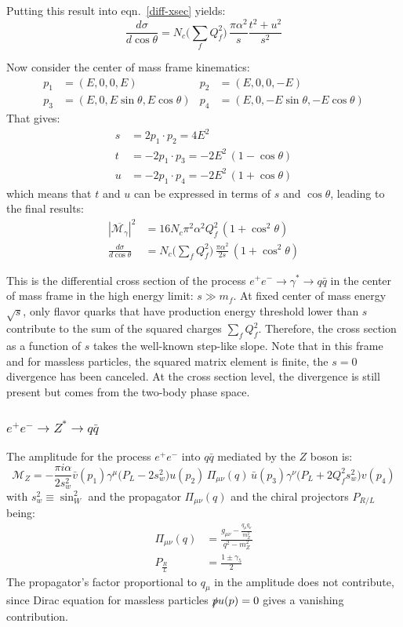 \documentclass[]{article}
\begin{document}
Putting this result into eqn.~\ref{diff-xsec} yields:
\begin{equation}
	\frac{d\sigma}{d\cos\theta} =
	N_c\big(\sum_fQ_f^2\big) \,\frac{\pi\alpha^2}{s} \frac{t^2+u^2}{s^2}
\end{equation}

Now consider the center of mass frame kinematics:
\begin{align*}
	p_1 &= (E,0,0,E) &	p_2 &= (E,0,0,-E)\\
	p_3 &= (E,0, E\sin\theta, E\cos\theta) & p_4 &= (E,0, -E\sin\theta, -E\cos\theta)
\end{align*}
That gives:
\begin{align*}
	s &= 2 p_1 \cdot p_2 = 4 E^2 \\
	t &= -2 p_1 \cdot p_3 = -2 E^2 \,(1-\cos\theta) \\
	u &= -2 p_1 \cdot p_4 = -2 E^2 \,(1+\cos\theta)
\end{align*}
which means that $t$ and $u$ can be expressed in terms of $s$ and $\cos\theta$,
leading to the final results:
\begin{align}
	\label{a2}
	|\overline{\mathcal{M}_\gamma}|^2 &= 16N_c \pi^2\alpha^2 Q_f^2\,(1+\cos^2\theta)\\
	\frac{d\sigma}{d\cos\theta} &= N_c\big(\sum_fQ_f^2\big) \,\frac{\pi\alpha^2}{2s}\, (1+\cos^2\theta)
\end{align}

This is the differential cross section of the process $e^+ e^- \rightarrow
\gamma^* \rightarrow q \bar{q}$ in the center of mass frame in the high energy
limit: $s \gg m_f$. At fixed center of mass energy $\sqrt{s}$, only flavor quarks
that have production energy threshold lower than $s$ contribute to the sum of
the squared charges $\sum_fQ^2_f$. Therefore, the cross section as a function of
$s$ takes the well-known step-like slope. Note that in this frame and for massless
particles, the squared matrix element is finite, the $s=0$ divergence has been
canceled. At the cross section level, the divergence is still present but
comes from the two-body phase space.

\subsubsection{$e^+ e^- \rightarrow Z^* \rightarrow q \bar{q}$}
The amplitude for the process $e^+ e^-$ into $q \bar{q}$ mediated by the $Z$ boson is:
\begin{equation}
\mathcal{M}_Z = -\frac{\pi i \alpha}{2 s^2_w} 
\bar{v}(p_1)\gamma^\mu\big(P_L-2s^2_w\big) u(p_2)\,\Pi_{\mu\nu}(q)\,
\bar{u}(p_3)\gamma^\nu \big(P_L+2Q_f^2 s^2_w\big) v(p_4)
\end{equation}
with $s^2_w \equiv \sin^2_W$ and the propagator $\Pi_{\mu\nu}(q)$ and the chiral
projectors $P_{R/L}$ being:
\begin{align*}
\Pi_{\mu\nu}(q) &= \frac{g_{\mu\nu}-\frac{q_\mu q_\nu}{m_Z^2}}{q^2- m_Z^2}\\
P_{\frac{R}{L}} &= \frac{1\pm\gamma_5}{2}
\end{align*}
The propagator's factor proportional to $q_\mu$ in the amplitude does not
contribute, since Dirac equation for massless particles $\slashed{p}u(p)=0$
gives a vanishing contribution.
\end{document}
